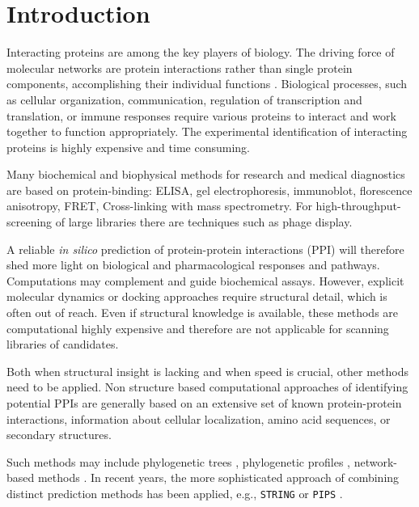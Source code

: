 \documentclass[3p,times,twocolumn]{elsarticle}
\begin{document}
\maketitle



\section{Introduction}

Interacting proteins are among the key players of biology. The driving
force of molecular networks are protein interactions rather than
single protein components, accomplishing their individual functions
\cite{Pawson:2004}. Biological processes, such as cellular
organization, communication, regulation of transcription and
translation, or immune responses require various proteins to interact
and work together to function appropriately. The experimental
identification of interacting proteins is highly expensive and time
consuming.

Many biochemical and biophysical methods for research and medical diagnostics are based on protein-binding:
ELISA,
gel electrophoresis, immunoblot, florescence anisotropy, FRET,
Cross-linking with mass spectrometry. For high-throughput-screening of
large libraries there are techniques such as phage display. 

A reliable \textit{in silico} prediction of protein-protein
interactions (PPI) will therefore shed more light on biological and
pharmacological responses and pathways. Computations may complement
and guide biochemical assays. However, explicit molecular dynamics or
docking approaches require structural detail, which is often out of
reach. Even if structural knowledge is available, these methods are
computational highly expensive and therefore are not applicable for
scanning libraries of candidates. 

Both when structural insight is lacking and when speed is crucial,
other methods need to be applied. Non structure based computational
approaches of identifying potential PPIs are generally based on an
extensive set of known protein-protein interactions, information about
cellular localization, amino acid sequences, or secondary structures.

Such methods may include phylogenetic trees \cite{Pazos:2001},
phylogenetic profiles \cite{Barker:2005}, network-based methods
\cite{Yook:2004, Clauset:2008}. In recent years, the more
sophisticated approach of combining distinct prediction methods has
been applied, e.g., \texttt{STRING} \cite{Szklarczyk:2011} or
\texttt{PIPS} \cite{McDowall:2009}.
\end{document}
